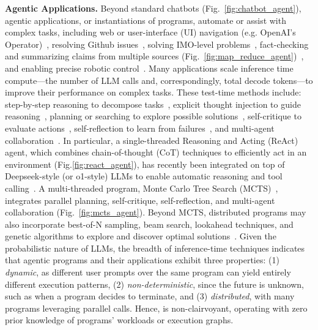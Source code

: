 
\vspace{2mm}
\noindent \textbf{Agentic Applications.} Beyond standard chatbots (Fig.~\ref{fig:chatbot_agent}), agentic applications, or instantiations of programs, automate or assist with complex tasks, including web or user-interface (UI) navigation (e.g. OpenAI's Operator)~\cite{OpenAIOperator, zhou2024webarenarealisticwebenvironment, gur2024realworldwebagentplanninglong,digirl}, resolving Github issues~\cite{jimenez2024swebench, yang2024sweagentagentcomputerinterfacesenable, wang2024openhandsopenplatformai}, solving IMO-level problems~\cite{deepmind_imo_silver_2024, kumarappan2024leanagentlifelonglearningformal}, fact-checking and summarizing claims from multiple sources (Fig.~\ref{fig:map_reduce_agent})~\cite{genspark2024, lin2024parrotefficientservingllmbased}, and enabling precise robotic control~\cite{rosser2024headsbetteronecollaborative}. Many applications scale inference time compute—the number of LLM calls and, correspondingly, total decode tokens—to improve their performance on complex tasks. These test-time methods include: step-by-step reasoning to decompose tasks~\cite{wei2023chainofthoughtpromptingelicitsreasoning, self-ask}, explicit thought injection to guide reasoning~\cite{yao2023reactsynergizingreasoningacting}, planning or searching to explore possible solutions~\cite{yao2023treethoughtsdeliberateproblem, Besta_2024, zhou2024languageagenttreesearch}, self-critique to evaluate actions~\cite{llmasjudge, stylus}, self-reflection to learn from failures~\cite{shinn2023reflexionlanguageagentsverbal, kumar2024traininglanguagemodelsselfcorrect}, and multi-agent collaboration~\cite{wu2023autogenenablingnextgenllm, societyofminds}. In particular, a single-threaded Reasoning and Acting (ReAct) agent, which combines chain-of-thought (CoT) techniques to efficiently act in an environment (Fig.\ref{fig:react_agent}), has recently been integrated on top of Deepseek-style (or o1-style) LLMs to enable automatic reasoning and tool calling~\cite{deepseekai2025deepseekr1incentivizingreasoningcapability, wang2024openhandsopenplatformai,RAGEN}. A multi-threaded program, Monte Carlo Tree Search (MCTS)~\cite{zhou2024languageagenttreesearch}, integrates parallel planning, self-critique, self-reflection, and multi-agent collaboration (Fig.~\ref{fig:mcts_agent}). Beyond MCTS, distributed programs may also incorporate best-of-N sampling, beam search, lookahead techniques, and genetic algorithms to explore and discover optimal solutions~\cite{chow2024inferenceawarefinetuningbestofnsampling, snell2024scalingllmtesttimecompute, davis2024networksnetworkscomplexityclass, lee2025evolvingdeeperllmthinking}. Given the probabilistic nature of LLMs, the breadth of inference-time techniques indicates that agentic programs and their applications exhibit three properties: (1) \textit{dynamic}, as different user prompts over the same program can yield entirely different execution patterns, (2) \textit{non-deterministic}, since the future is unknown, such as when a program decides to terminate, and (3) \textit{distributed}, with many programs leveraging parallel calls. Hence, \text{\name} is non-clairvoyant, operating with zero prior knowledge of programs' workloads or execution graphs.




